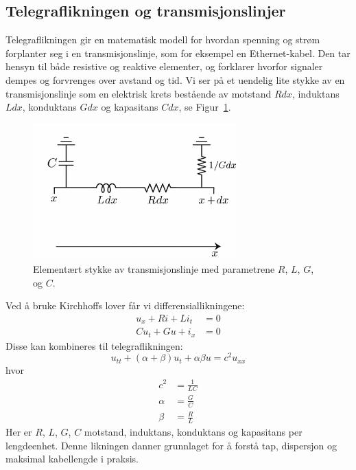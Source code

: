 \clearpage
\subsection{Telegraflikningen og transmisjonslinjer}

Telegraflikningen gir en matematisk modell for hvordan spenning og strøm forplanter seg i en transmisjonslinje, som for eksempel en Ethernet-kabel. Den tar hensyn til både resistive og reaktive elementer, og forklarer hvorfor signaler dempes og forvrenges over avstand og tid.
Vi ser på et uendelig lite stykke av en transmisjonslinje som en elektrisk krets bestående av motstand $R dx$, induktans $L dx$, konduktans $G dx$ og kapasitans $C dx$, se Figur~\ref{fig:telegraflinje}.

\begin{figure}[h]
    \centering
    \includegraphics[width=0.7\textwidth]{Media/telegraflinje.png}
    \caption{Elementært stykke av transmisjonslinje med parametrene $R$, $L$, $G$, og $C$.}
    \label{fig:telegraflinje}
\end{figure}

\noindent Ved å bruke Kirchhoffs lover får vi differensiallikningene:
\begin{align}
u_x + R i + L i_t &= 0 \\
C u_t + G u + i_x &= 0
\end{align}
Disse kan kombineres til telegraflikningen:
\begin{equation}
u_{tt} + (\alpha + \beta) u_t + \alpha \beta u = c^2 u_{xx}
\end{equation}
hvor
\begin{align*}
c^2 &= \frac{1}{LC} \\
\alpha &= \frac{G}{C} \\
\beta &= \frac{R}{L}
\end{align*}
Her er $R$, $L$, $G$, $C$ motstand, induktans, konduktans og kapasitans per lengdeenhet. Denne likningen danner grunnlaget for å forstå tap, dispersjon og maksimal kabellengde i praksis.

